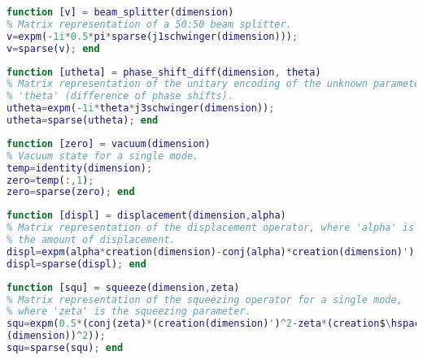 \begin{lstlisting}[language=Matlab]
function [v] = beam_splitter(dimension)
% Matrix representation of a 50:50 beam splitter. 
v=expm(-1i*0.5*pi*sparse(j1schwinger(dimension)));
v=sparse(v); end
\end{lstlisting}

\begin{lstlisting}[language=Matlab]
function [utheta] = phase_shift_diff(dimension, theta)
% Matrix representation of the unitary encoding of the unknown parameter 
% 'theta' (difference of phase shifts).
utheta=expm(-1i*theta*j3schwinger(dimension));
utheta=sparse(utheta); end
\end{lstlisting}

\begin{lstlisting}[language=Matlab]
function [zero] = vacuum(dimension)
% Vacuum state for a single mode.
temp=identity(dimension);
zero=temp(:,1);
zero=sparse(zero); end
\end{lstlisting}

\begin{lstlisting}[language=Matlab]
function [displ] = displacement(dimension,alpha)
% Matrix representation of the displacement operator, where 'alpha' is
% the amount of displacement. 
displ=expm(alpha*creation(dimension)-conj(alpha)*creation(dimension)');
displ=sparse(displ); end
\end{lstlisting}

\begin{lstlisting}[language=Matlab, mathescape=true]
function [squ] = squeeze(dimension,zeta)
% Matrix representation of the squeezing operator for a single mode, 
% where 'zeta' is the squeezing parameter.
squ=expm(0.5*(conj(zeta)*(creation(dimension)')^2-zeta*(creation$\hspace{0.15em}\swarrow$
(dimension))^2));
squ=sparse(squ); end
\end{lstlisting}

